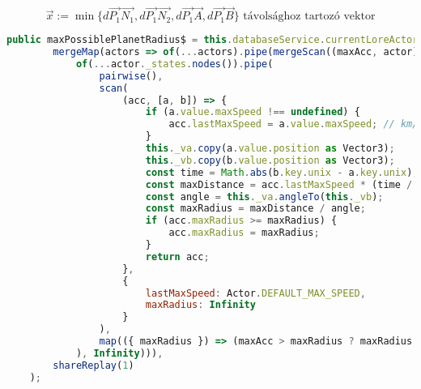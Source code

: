 $$\overrightarrow{x} :=  \min{\{d\overrightarrow{P_1}\overrightarrow{N_1}, d\overrightarrow{P_1}\overrightarrow{N_2}, d\overrightarrow{P_1}\overrightarrow{A}, d\overrightarrow{P_1}\overrightarrow{B}\}} \text{ távolsághoz tartozó vektor}$$


























\begin{lstlisting}[language={JavaScript}]
	public maxPossiblePlanetRadius$ = this.databaseService.currentLoreActors$.pipe(
		mergeMap(actors => of(...actors).pipe(mergeScan((maxAcc, actor) =>
			of(...actor._states.nodes()).pipe(
				pairwise(),
				scan(
					(acc, [a, b]) => {
						if (a.value.maxSpeed !== undefined) {
							acc.lastMaxSpeed = a.value.maxSpeed; // km/h
						}
						this._va.copy(a.value.position as Vector3);
						this._vb.copy(b.value.position as Vector3);
						const time = Math.abs(b.key.unix - a.key.unix); // s
						const maxDistance = acc.lastMaxSpeed * (time / 3600);
						const angle = this._va.angleTo(this._vb);
						const maxRadius = maxDistance / angle;
						if (acc.maxRadius >= maxRadius) {
							acc.maxRadius = maxRadius;
						}
						return acc;
					},
					{
						lastMaxSpeed: Actor.DEFAULT_MAX_SPEED,
						maxRadius: Infinity
					}
				),
				map(({ maxRadius }) => (maxAcc > maxRadius ? maxRadius : maxAcc))
			), Infinity))),
		shareReplay(1)
	);

\end{lstlisting}






























